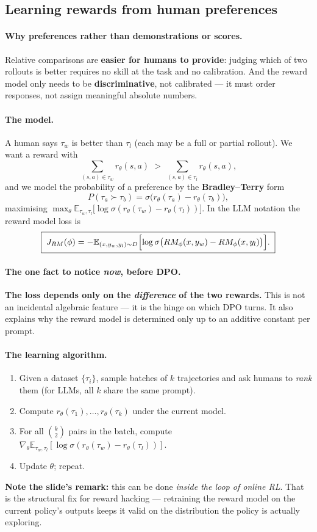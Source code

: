 \documentclass[11pt,a4paper]{article}
\begin{document}
\subsection{Learning rewards from human preferences}

\paragraph{Why preferences rather than demonstrations or scores.} Relative
comparisons are \textbf{easier for humans to provide}: judging which of two
rollouts is better requires no skill at the task and no calibration. And the
reward model only needs to be \textbf{discriminative}, not calibrated --- it
must order responses, not assign meaningful absolute numbers.

\paragraph{The model.} A human says $\tau_w$ is better than $\tau_l$
(each may be a full or partial rollout). We want a reward with
\[
\sum_{(s,a)\in\tau_w} r_\theta(s,a) \;>\; \sum_{(s,a)\in\tau_l} r_\theta(s,a),
\]
and we model the probability of a preference by the \textbf{Bradley--Terry}
form
\[
P(\tau_a\succ\tau_b)=\sigma\bigl(r_\theta(\tau_a)-r_\theta(\tau_b)\bigr),
\]
maximising $\max_\theta \mathbb E_{\tau_w,\tau_l}\bigl[\log\sigma(r_\theta(\tau_w)-r_\theta(\tau_l))\bigr]$.
In the LLM notation the reward model loss is
\[
\boxed{\;J_{RM}(\phi)=-\mathbb E_{(x,y_w,y_l)\sim D}\Bigl[\log\sigma\bigl(RM_\phi(x,y_w)-RM_\phi(x,y_l)\bigr)\Bigr].\;}
\]

\paragraph{The one fact to notice \emph{now}, before DPO.} \textbf{The loss
depends only on the \emph{difference} of the two rewards.} This is not an
incidental algebraic feature --- it is the hinge on which DPO turns. It also
explains why the reward model is determined only up to an additive constant
per prompt.

\paragraph{The learning algorithm.}
\begin{enumerate}[label=\arabic*.]
\item Given a dataset $\{\tau_i\}$, sample batches of $k$ trajectories and ask
humans to \emph{rank} them (for LLMs, all $k$ share the same prompt).
\item Compute $r_\theta(\tau_1),\dots,r_\theta(\tau_k)$ under the current model.
\item For all $\binom{k}{2}$ pairs in the batch, compute
$\nabla_\theta\mathbb E_{\tau_w,\tau_l}[\log\sigma(r_\theta(\tau_w)-r_\theta(\tau_l))]$.
\item Update $\theta$; repeat.
\end{enumerate}
\textbf{Note the slide's remark:} this can be done \emph{inside the loop of
online RL}. That is the structural fix for reward hacking --- retraining the
reward model on the current policy's outputs keeps it valid on the
distribution the policy is actually exploring.
\end{document}
